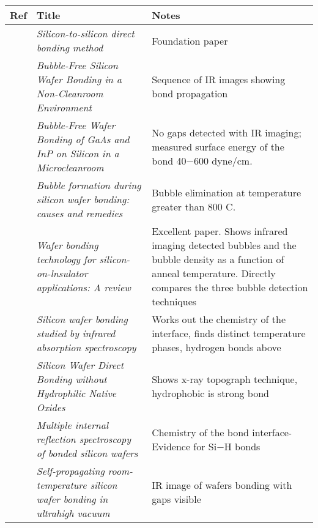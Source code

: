\documentclass[osajnl,preprint,showpacs,superscriptaddress,12pt]{revtex4-1} %
\begin{document}
\begin{spacing}{1.0} 

\begin{center}
\begin{longtable}{ |c | p{8cm} | p{8cm} |}

    \hline
    Ref & Title & Notes \\ 
        \hline
	\cite{1986JAP....60.2987S} &  \emph{Silicon-to-silicon direct bonding method} &  Foundation paper  \\
         \hline
     \cite{1988JaJAP..27L2364S} &  \emph{Bubble-Free Silicon Wafer Bonding in a Non-Cleanroom Environment} &  Sequence of IR images showing bond propagation  \\
         \hline
     \cite{1989JaJAP..28L2141L} &  \emph{Bubble-Free Wafer Bonding of GaAs and InP on Silicon in a Microcleanroom} &  No gaps detected with IR imaging; measured surface energy of the bond 40$-$600 dyne/cm.  \\
         \hline
     \cite{Mitani1990} &  \emph{Bubble formation during silicon wafer bonding: causes and remedies} &  Bubble elimination at temperature greater than 800 C. \\
         \hline
	\cite{1992JEMat..21..669M} &  \emph{Wafer bonding technology for silicon-on-lnsulator applications: A review} &  Excellent paper.  Shows infrared imaging detected bubbles and the bubble density as a function of anneal temperature.  Directly compares the three bubble detection techniques\\
         \hline
     \cite{feijoo1994} &  \emph{Silicon wafer bonding studied by infrared absorption spectroscopy} &  Works out the chemistry of the interface, finds distinct temperature phases, hydrogen bonds above   \\          
         \hline
     \cite{1994JaJAP..33....6H} &  \emph{Silicon Wafer Direct Bonding without Hydrophilic Native Oxides} &  Shows x-ray topograph technique, hydrophobic is strong bond\\
              \hline         
     \cite{1995ApPhA..61..101R} &  \emph{Multiple internal reflection spectroscopy of bonded silicon wafers} &  Chemistry of the bond interface- Evidence for Si$-$H bonds\\
              \hline
     \cite{1995ApPhL..67.3614G} &  \emph{Self-propagating room-temperature silicon wafer bonding in ultrahigh vacuum} &  IR image of wafers bonding with gaps visible  \\

\end{longtable}
\end{center}
\end{spacing}
\end{document}
